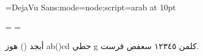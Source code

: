 


\font\aaa={DejaVu Sans:mode=node;script=arab} at 10pt\aaa

\showboxdepth=\maxdimen
\showboxbreadth=\maxdimen

%




أبجد () هوز ab()cd حطي g كلمن ١٢٣٤٥ سعفص قرست.


\bye

